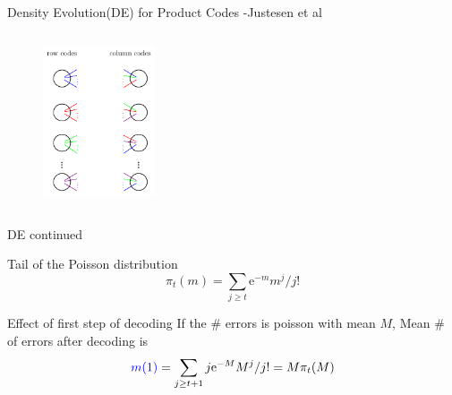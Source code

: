 \documentclass[10pt,xcolor=table]{beamer}
\begin{document}
\begin{frame}{Density Evolution(DE) for Product Codes -Justesen et al}
\begin{columns}
	   	\begin{figure}[t]
	   		\centering
	   		\includegraphics[width=1.3in]{./Figures/Bipartite_graph}
	   	\end{figure}
	   		
	   \end{columns}
	
	\end{frame}
	\begin{frame}{DE continued}
		\begin{block}{Tail of the Poisson distribution}
			\begin{equation}\nonumber
			\pi_t(m) = \sum_{j \geq t} \mathrm{e}^{-m}m^j/j!
			\label{eqn:defpi}
			\end{equation}
		\end{block}
		
		\begin{block}{Effect of first step of decoding}
			If the \# errors is poisson with mean $M$, Mean \# of errors after decoding is
			\begin{equation}\nonumber
			\textcolor{blue}{m(1)} = \sum_{j \geq t+1} j\mathrm{e}^{-M}M^j/j! = M\pi_t(M)
			\label{eqn:defpi}
			\end{equation}
		\end{block}
		
	\end{frame}
\end{document}
